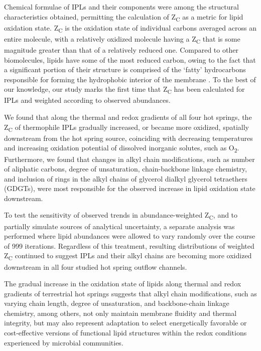 Chemical formulae of IPLs and their components were among the structural characteristics obtained, permitting the calculation of Z\textsubscript{C} as a metric for lipid oxidation state. Z\textsubscript{C} is the oxidation state of individual carbons averaged across an entire molecule, with a relatively oxidized molecule having a Z\textsubscript{C} that is some magnitude greater than that of a relatively reduced one. Compared to other biomolecules, lipids have some of the most reduced carbon, owing to the fact that a significant portion of their structure is comprised of the `fatty' hydrocarbons responsible for forming the hydrophobic interior of the membrane \citep{likens2010biogeochemistry}. To the best of our knowledge, our study marks the first time that Z\textsubscript{C} has been calculated for IPLs and weighted according to observed abundances.


We found that along the thermal and redox gradients of all four hot springs, the Z\textsubscript{C} of thermophile IPLs gradually increased, or became more oxidized, spatially downstream from the hot spring source, coinciding with decreasing temperatures and increasing oxidation potential of dissolved inorganic solutes, such as O\textsubscript{2}. Furthermore, we found that changes in alkyl chain modifications, such as number of aliphatic carbons, degree of unsaturation, chain-backbone linkage chemistry, and inclusion of rings in the alkyl chains of glycerol dialkyl glycerol tetraethers (GDGTs), were most responsible for the observed increase in lipid oxidation state downstream.

To test the sensitivity of observed trends in abundance-weighted Z\textsubscript{C}, and to partially simulate sources of analytical uncertainty, a separate analysis was performed where lipid abundances were allowed to vary randomly over the course of 999 iterations. Regardless of this treatment, resulting distributions of weighted Z\textsubscript{C} continued to suggest IPLs and their alkyl chains are becoming more oxidized downstream in all four studied hot spring outflow channels.

The gradual increase in the oxidation state of lipids along thermal and redox gradients of terrestrial hot springs suggests that alkyl chain modifications, such as varying chain length, degree of unsaturation, and backbone-chain linkage chemistry, among others, not only maintain membrane fluidity and thermal integrity, but may also represent adaptation to select energetically favorable or cost-effective versions of functional lipid structures within the redox conditions experienced by microbial communities.

